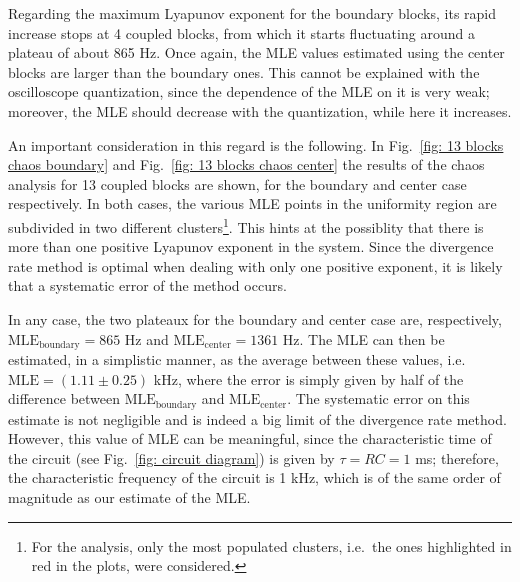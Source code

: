 Regarding the maximum Lyapunov exponent for the boundary blocks, its rapid increase stops at 4 coupled
blocks, from which it starts fluctuating around a plateau of about 865 Hz.
Once again, the MLE values estimated using the center blocks are larger than the boundary ones.
This cannot be explained with the oscilloscope quantization, since the dependence of the MLE on
it is very weak; moreover, the MLE should decrease with the quantization, while here it increases.

An important consideration in this regard is the following. In Fig.~\ref{fig: 13 blocks chaos boundary}
and Fig.~\ref{fig: 13 blocks chaos center}
the results of the chaos analysis for 13 coupled blocks are shown, for the boundary and center case
respectively. In both cases, the various MLE points in the uniformity region are subdivided in two different clusters\footnote{
For the analysis, only the most populated clusters, i.e.\ the ones highlighted in red in the plots,
were considered.}.
This hints at the possiblity that there is more than one positive Lyapunov exponent in the system.
Since the divergence rate method is optimal when dealing with only one positive exponent,
it is likely that a systematic error of the method occurs.

In any case, the two plateaux for the boundary and center case are, respectively,
$\text{MLE}_\text{boundary}=865$ Hz and $\text{MLE}_\text{center}=1361$ Hz.
The MLE can then be estimated, in a simplistic manner, as the average between
these values, i.e.\ $\text{MLE}=(1.11\pm0.25)$ kHz, where the error is simply given by half of the difference
between $\text{MLE}_\text{boundary}$ and $\text{MLE}_\text{center}$.
The systematic error on this estimate
is not negligible and is indeed a big limit of the divergence rate method.
However, this value of MLE can be meaningful, since the characteristic time of the circuit
(see Fig.~\ref{fig: circuit diagram}) is given by $\tau=RC=1$ ms; therefore, the characteristic
frequency of the circuit is 1 kHz, which is of the same order of magnitude as our estimate of the MLE\@.


